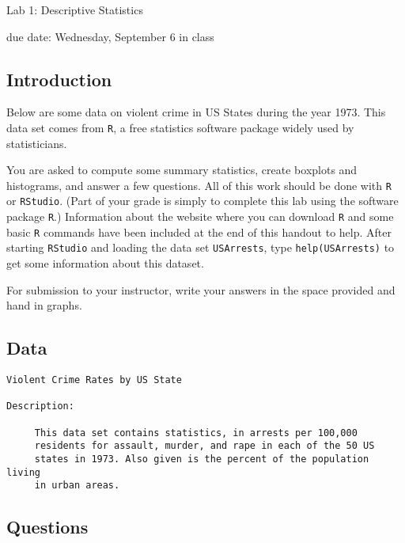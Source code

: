 \documentclass{report}
\begin{document}
{\bf \centerline{{\large Lab 1: Descriptive Statistics}}}

\centerline{due date: Wednesday, September 6 in class}

\bigskip

\subsection*{Introduction}

Below are some data on violent crime in US States during the year
1973. This data set comes from {\tt R}, a free statistics software package
widely used by statisticians.

You are asked to compute some summary statistics, create boxplots
and histograms, and answer a few questions.  All of this work should 
be done with {\tt R} or {\tt RStudio}.  (Part of your grade is simply to complete
this lab using the software package {\tt R}.)
Information about the website where you can download {\tt R} and some
basic {\tt R} commands have been included at the end of this handout to help.  
After starting {\tt RStudio} and loading the data set {\tt USArrests}, type
{\tt help(USArrests)} to get some information about this dataset.

For submission to your instructor, write your answers in the space provided 
and hand in graphs.

\subsection*{Data}

\begin{verbatim}
Violent Crime Rates by US State

Description:

     This data set contains statistics, in arrests per 100,000
     residents for assault, murder, and rape in each of the 50 US
     states in 1973. Also given is the percent of the population living
     in urban areas.
\end{verbatim}

\subsection*{Questions}
\end{document}
